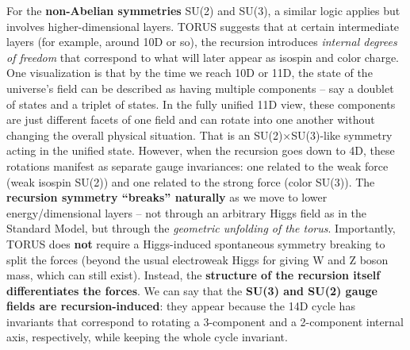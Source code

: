 \documentclass[
]{article}
\begin{document}
For the \textbf{non-Abelian symmetries} SU(2) and SU(3), a similar logic
applies but involves higher-dimensional layers. TORUS suggests that at
certain intermediate layers (for example, around 10D or so), the
recursion introduces \emph{internal degrees of freedom} that correspond
to what will later appear as isospin and color charge\hspace{0pt}. One
visualization is that by the time we reach 10D or 11D, the state of the
universe's field can be described as having multiple components -- say a
doublet of states and a triplet of states. In the fully unified 11D
view, these components are just different facets of one field and can
rotate into one another without changing the overall physical situation.
That is an SU(2)×SU(3)-like symmetry acting in the unified state.
However, when the recursion goes down to 4D, these rotations manifest as
separate gauge invariances: one related to the weak force (weak isospin
SU(2)) and one related to the strong force (color SU(3)). The
\textbf{recursion symmetry ``breaks'' naturally} as we move to lower
energy/dimensional layers -- not through an arbitrary Higgs field as in
the Standard Model, but through the \emph{geometric unfolding of the
torus}. Importantly, TORUS does \textbf{not} require a Higgs-induced
spontaneous symmetry breaking to split the forces (beyond the usual
electroweak Higgs for giving W and Z boson mass, which can still exist).
Instead, the \textbf{structure of the recursion itself differentiates
the forces}\hspace{0pt}. We can say that the \textbf{SU(3) and SU(2)
gauge fields are recursion-induced}: they appear because the 14D cycle
has invariants that correspond to rotating a 3-component and a
2-component internal axis, respectively, while keeping the whole cycle
invariant.
\end{document}
